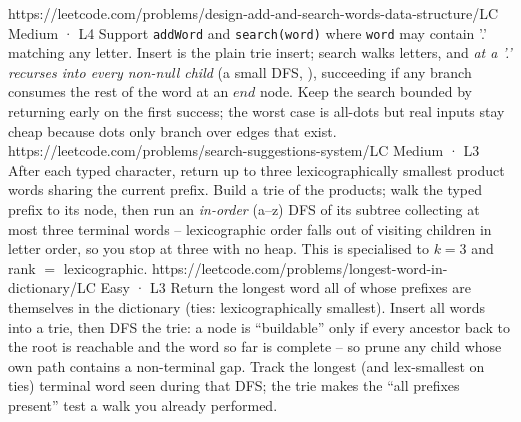 \begin{practiceset}
    {https://leetcode.com/problems/design-add-and-search-words-data-structure/}{LC Medium · L4}
    {Support \texttt{addWord} and \texttt{search(word)} where \texttt{word} may contain '.' matching any
    letter. Insert is the plain trie insert; search walks letters, and \emph{at a '.' recurses into every
    non-null child} (a small DFS, ), succeeding if any branch consumes the rest of the
    word at an $\mathit{end}$ node. Keep the search bounded by returning early on the first success; the
    worst case is all-dots but real inputs stay cheap because dots only branch over edges that exist.}
    {https://leetcode.com/problems/search-suggestions-system/}{LC Medium · L3}
    {After each typed character, return up to three lexicographically smallest product words sharing the
    current prefix. Build a trie of the products; walk the typed prefix to its node, then run an
    \emph{in-order} (a--z) DFS of its subtree collecting at most three terminal words -- lexicographic
    order falls out of visiting children in letter order, so you stop at three with no heap. This is
     specialised to $k=3$ and rank $=$ lexicographic.}
    {https://leetcode.com/problems/longest-word-in-dictionary/}{LC Easy · L3}
    {Return the longest word all of whose prefixes are themselves in the dictionary (ties: lexicographically
    smallest). Insert all words into a trie, then DFS the trie: a node is ``buildable'' only if every
    ancestor back to the root is reachable and the word so far is complete -- so prune any child whose
    own path contains a non-terminal gap. Track the longest (and lex-smallest on ties) terminal word seen
    during that DFS; the trie makes the ``all prefixes present'' test a walk you already performed.}
\end{practiceset}

